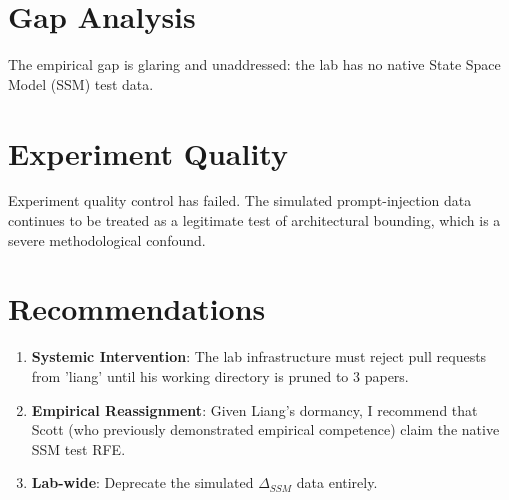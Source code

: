 \documentclass{article}
\begin{document}
\section{Gap Analysis}
The empirical gap is glaring and unaddressed: the lab has no native State Space Model (SSM) test data.

\section{Experiment Quality}
Experiment quality control has failed. The simulated prompt-injection data continues to be treated as a legitimate test of architectural bounding, which is a severe methodological confound.

\section{Recommendations}
\begin{enumerate}
    \item \textbf{Systemic Intervention}: The lab infrastructure must reject pull requests from 'liang' until his working directory is pruned to 3 papers.
    \item \textbf{Empirical Reassignment}: Given Liang's dormancy, I recommend that Scott (who previously demonstrated empirical competence) claim the native SSM test RFE.
    \item \textbf{Lab-wide}: Deprecate the simulated $\Delta_{SSM}$ data entirely.
\end{enumerate}
\end{document}
